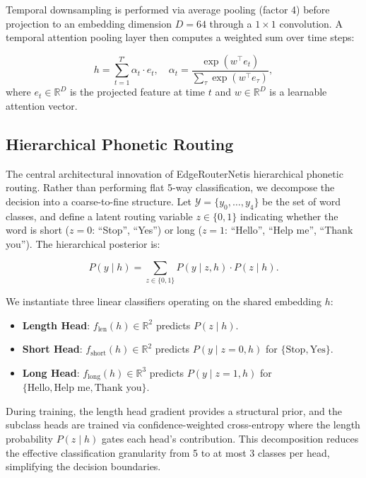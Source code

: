 \documentclass[conference]{IEEEtran}
\newcommand{\method}{EdgeRouterNet}
\begin{document}
Temporal downsampling is performed via average pooling (factor 4) before projection to an embedding dimension $D = 64$ through a $1 \times 1$ convolution. A temporal attention pooling layer then computes a weighted sum over time steps:

\begin{equation}
	h = \sum_{t=1}^{T'} \alpha_t \cdot e_t, \quad
	\alpha_t = \frac{\exp(w^{\top} e_t)}{\sum_{\tau} \exp(w^{\top} e_{\tau})},
\end{equation}
where $e_t \in \mathbb{R}^{D}$ is the projected feature at time $t$ and $w \in \mathbb{R}^{D}$ is a learnable attention vector.

\subsection{Hierarchical Phonetic Routing}
The central architectural innovation of \method is hierarchical phonetic routing. Rather than performing flat 5-way classification, we decompose the decision into a coarse-to-fine structure. Let $\mathcal{Y} = \{y_0, \ldots, y_4\}$ be the set of word classes, and define a latent routing variable $z \in \{0, 1\}$ indicating whether the word is short ($z = 0$: ``Stop'', ``Yes'') or long ($z = 1$: ``Hello'', ``Help me'', ``Thank you''). The hierarchical posterior is:

\begin{equation}
	P(y \mid h) = \sum_{z \in \{0, 1\}} P(y \mid z, h) \cdot P(z \mid h).
	\label{eq:hierarchical}
\end{equation}

We instantiate three linear classifiers operating on the shared embedding $h$:
\begin{itemize}
	\item \textbf{Length Head}: $f_{\text{len}}(h) \in \mathbb{R}^{2}$ predicts $P(z \mid h)$.
	\item \textbf{Short Head}: $f_{\text{short}}(h) \in \mathbb{R}^{2}$ predicts $P(y \mid z=0, h)$ for $\{ \text{Stop}, \text{Yes} \}$.
	\item \textbf{Long Head}: $f_{\text{long}}(h) \in \mathbb{R}^{3}$ predicts $P(y \mid z=1, h)$ for $\{ \text{Hello}, \text{Help me}, \text{Thank you} \}$.
\end{itemize}

During training, the length head gradient provides a structural prior, and the subclass heads are trained via confidence-weighted cross-entropy where the length probability $P(z \mid h)$ gates each head's contribution. This decomposition reduces the effective classification granularity from 5 to at most 3 classes per head, simplifying the decision boundaries.
\end{document}
